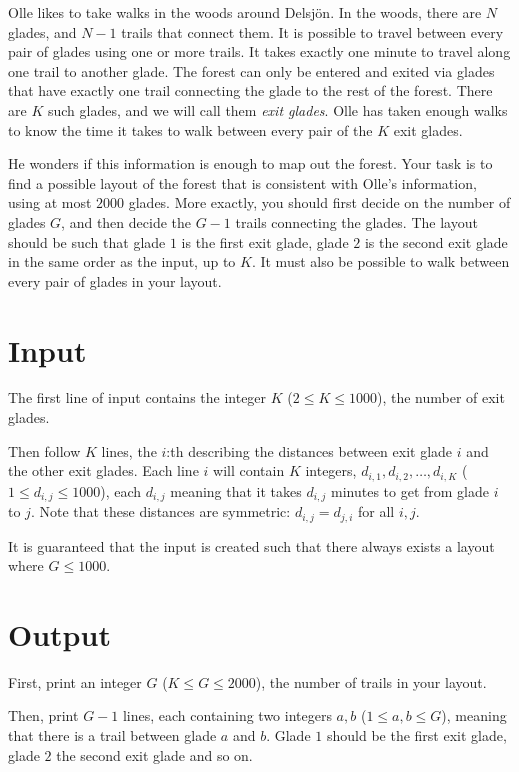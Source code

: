 \noindent

Olle likes to take walks in the woods around Delsjön. In the woods, there are $N$ glades, and $N-1$
trails that connect them. It is possible to travel between every pair of glades using one or more trails.
It takes exactly one minute to travel along one trail to another glade. 
The forest can only be entered and exited via glades that have exactly one trail connecting the glade
to the rest of the forest. There are $K$ such glades, and we will call them \textit{exit glades}.
Olle has taken enough walks to know the time it takes to walk between every pair of the $K$ exit glades.

He wonders if this information is enough to map out the forest. Your task is to find a possible layout of the
forest that is consistent with Olle's information, using at most $2000$ glades. More exactly, you should first
decide on the number of glades $G$, and then decide the $G-1$ trails connecting the glades. The layout should
be such that glade $1$ is the first exit glade, glade $2$ is the second exit glade in the same order as the input, up to $K$.
It must also be possible to walk between every pair of glades in your layout.

\section*{Input}
The first line of input contains the integer $K$ ($2 \leq K \leq 1000$), the number of exit glades.

Then follow $K$ lines, the $i$:th describing the distances between exit glade $i$ and the other exit glades. Each line $i$ will contain
$K$ integers, $d_{i,1}, d_{i,2}, \dots, d_{i,K}$ ($1 \leq d_{i,j} \leq 1000$), each $d_{i,j}$ meaning that it takes $d_{i,j}$ 
minutes to get from glade $i$ to $j$. Note that these distances are symmetric: $d_{i,j}=d_{j,i}$ for all $i,j$.

It is guaranteed that the input is created such that there always exists a layout where $G \leq 1000$.

\section*{Output}
First, print an integer $G$ ($K \leq G \leq 2000$), the number of trails in your layout.

Then, print $G-1$ lines, each containing two integers $a,b$ ($1 \leq a,b \leq G$), meaning that there
is a trail between glade $a$ and $b$. Glade $1$ should be the first exit glade, glade $2$ the second
exit glade and so on.

